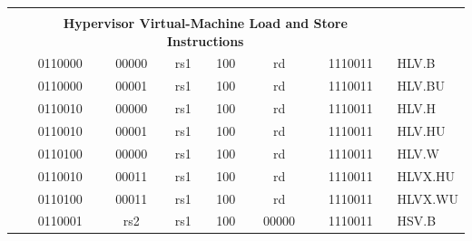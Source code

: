 \documentclass{../runikraft-report}
\begin{document}
{\begin{longtable}{p{0in}p{0.4in}p{0.05in}p{0.05in}p{0.05in}p{0.05in}p{0.4in}p{0.6in}p{0.4in}p{0.6in}p{0.7in}l}
    &
    \multicolumn{10}{c}{} & \\
    &
    \multicolumn{10}{c}{\bf Hypervisor Virtual-Machine Load and Store Instructions} & \\
    \cline{2-11}


    &
    \multicolumn{4}{|c|}{0110000} &
    \multicolumn{2}{c|}{00000} &
    \multicolumn{1}{c|}{rs1} &
    \multicolumn{1}{c|}{100} &
    \multicolumn{1}{c|}{rd} &
    \multicolumn{1}{c|}{1110011} & HLV.B \\
    \cline{2-11}


    &
    \multicolumn{4}{|c|}{0110000} &
    \multicolumn{2}{c|}{00001} &
    \multicolumn{1}{c|}{rs1} &
    \multicolumn{1}{c|}{100} &
    \multicolumn{1}{c|}{rd} &
    \multicolumn{1}{c|}{1110011} & HLV.BU \\
    \cline{2-11}


    &
    \multicolumn{4}{|c|}{0110010} &
    \multicolumn{2}{c|}{00000} &
    \multicolumn{1}{c|}{rs1} &
    \multicolumn{1}{c|}{100} &
    \multicolumn{1}{c|}{rd} &
    \multicolumn{1}{c|}{1110011} & HLV.H \\
    \cline{2-11}


    &
    \multicolumn{4}{|c|}{0110010} &
    \multicolumn{2}{c|}{00001} &
    \multicolumn{1}{c|}{rs1} &
    \multicolumn{1}{c|}{100} &
    \multicolumn{1}{c|}{rd} &
    \multicolumn{1}{c|}{1110011} & HLV.HU \\
    \cline{2-11}


    &
    \multicolumn{4}{|c|}{0110100} &
    \multicolumn{2}{c|}{00000} &
    \multicolumn{1}{c|}{rs1} &
    \multicolumn{1}{c|}{100} &
    \multicolumn{1}{c|}{rd} &
    \multicolumn{1}{c|}{1110011} & HLV.W \\
    \cline{2-11}


    &
    \multicolumn{4}{|c|}{0110010} &
    \multicolumn{2}{c|}{00011} &
    \multicolumn{1}{c|}{rs1} &
    \multicolumn{1}{c|}{100} &
    \multicolumn{1}{c|}{rd} &
    \multicolumn{1}{c|}{1110011} & HLVX.HU \\
    \cline{2-11}


    &
    \multicolumn{4}{|c|}{0110100} &
    \multicolumn{2}{c|}{00011} &
    \multicolumn{1}{c|}{rs1} &
    \multicolumn{1}{c|}{100} &
    \multicolumn{1}{c|}{rd} &
    \multicolumn{1}{c|}{1110011} & HLVX.WU \\
    \cline{2-11}


    &
    \multicolumn{4}{|c|}{0110001} &
    \multicolumn{2}{c|}{rs2} &
    \multicolumn{1}{c|}{rs1} &
    \multicolumn{1}{c|}{100} &
    \multicolumn{1}{c|}{00000} &
    \multicolumn{1}{c|}{1110011} & HSV.B \\
    \cline{2-11}



\end{longtable}}
\end{document}
